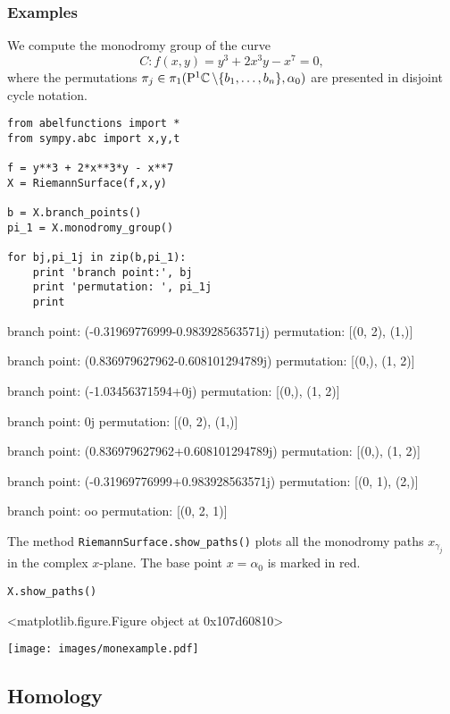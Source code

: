 %
\subsubsection*{Examples}
%

We compute the monodromy group of the curve
\[
    C : f(x,y) = y^3 + 2x^3y - x^7 = 0,
\]
where the permutations $\pi_j \in \pi_1(\mathrm{P}^1 \!\operatorname{\mathbb{C}} \backslash \{b_1,
\ldots, b_n\}, \alpha_0)$ are presented in disjoint cycle notation.
\begin{lstlisting}
from abelfunctions import *
from sympy.abc import x,y,t

f = y**3 + 2*x**3*y - x**7
X = RiemannSurface(f,x,y)

b = X.branch_points()
pi_1 = X.monodromy_group()

for bj,pi_1j in zip(b,pi_1):
    print 'branch point:', bj
    print 'permutation: ', pi_1j
    print
\end{lstlisting}
\begin{pyoutput}
branch point: (-0.31969776999-0.983928563571j)
permutation:  [(0, 2), (1,)]

branch point: (0.836979627962-0.608101294789j)
permutation:  [(0,), (1, 2)]

branch point: (-1.03456371594+0j)
permutation:  [(0,), (1, 2)]

branch point: 0j
permutation:  [(0, 2), (1,)]

branch point: (0.836979627962+0.608101294789j)
permutation:  [(0,), (1, 2)]

branch point: (-0.31969776999+0.983928563571j)
permutation:  [(0, 1), (2,)]

branch point: oo
permutation:  [(0, 2, 1)]
\end{pyoutput}
The method \verb=RiemannSurface.show_paths()= plots all the monodromy
paths $x_{\gamma_j}$ in the complex $x$-plane. The base point
$x=\alpha_0$ is marked in red.
\begin{lstlisting}[firstnumber=14]
X.show_paths()
\end{lstlisting}
\begin{pyoutput}
<matplotlib.figure.Figure object at 0x107d60810>
\end{pyoutput}
\begin{center}
\texttt{[image: images/monexample.pdf]}
\end{center}


\subsection{Homology} \label{sec: homology}

